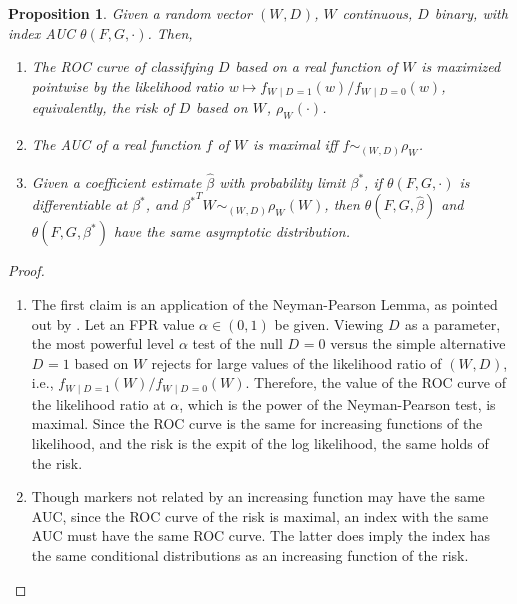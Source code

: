 \documentclass[12pt]{article}
\newcommand{\W}[1][]{W_{#1}}
\newcommand{\D}[1][]{D_{#1}}
\renewcommand{\t}[1]{{#1}^T}
\renewcommand{\star}[1]{{#1}^\ast}
\newcommand{\F}{F}
\newcommand{\G}{G}
\newcommand{\risk}[1][]{\rho_{#1}}
\newcommand{\auc}{\theta}
\newtheorem{proposition}[theorem]{Proposition}
\theoremstyle{definition}
\newcommand{\comment}[1]{
  \iftoggle{commenttoggle}{
    {\normalsize{\color{red}{ #1}}\normalsize}
  }
  {}
}
\begin{document}
\begin{proposition}
  Given a random vector $(\W,\D)$, $\W$ continuous, $\D$ binary, with
  index AUC $\auc(\F,\G,\cdot)$. Then,
\begin{enumerate}
\item The ROC curve of classifying $\D$ based on a real function of $\W$
is maximized pointwise by the likelihood ratio
$w\mapsto f_{\W\mid\D=1}(w)/f_{\W\mid\D=0}(w)$,\comment{cond desnities not defined}  equivalently, the risk of $\D$ based on $\W$, $\risk[{\W}](\cdot)$.

\item The AUC of a real function $f$ of $\W$ is maximal iff $f\sim_{(\W,\D)} \rho_{\W}$.

\item Given a coefficient estimate $\hat\beta$ with probability limit $\star\beta$, if $\auc(\F,\G,\cdot)$
  is differentiable at $\star\beta$, and
  $\t{\star\beta}\W\sim_{(\W,\D)} \risk[\W](\W)$,\comment{slight abuse of $\sim$ notation here} then $\auc(\F,\G,\hat\beta)$ and
  $\auc(\F,\G,\star\beta)$ have the same asymptotic distribution.
\end{enumerate}
\end{proposition}
\begin{proof}
  \begin{enumerate}
  \item The first claim is an application of the Neyman-Pearson Lemma,
    as pointed out by \citet{pepe2013}\comment{ check if she did it
      first. swets.}. Let an FPR value $\alpha\in (0,1)$ be
    given. Viewing $\D$ as a parameter, the most powerful level
    $\alpha$ test of the null $\D=0$ versus the simple alternative
    $\D=1$ based on $\W$ rejects for large values of the likelihood
    ratio of $(\W,\D)$, i.e.,
    $f_{\W\mid\D=1}(W)/f_{\W\mid\D=0}(W)$. Therefore, the value of the
    ROC curve of the likelihood ratio at $\alpha$, which is the power
    of the Neyman-Pearson test, is maximal. Since the ROC curve is the
    same for increasing functions of the likelihood, and the risk is
    the expit of the log likelihood, the same holds of the risk.
  
  \item Though markers not related by an increasing function may have the
  same AUC, since the ROC curve of the risk is maximal, an index with
  the same AUC must have the same ROC curve. The latter does imply the
  index has the same conditional distributions as an increasing
  function of the risk.
\end{enumerate}
\end{proof}
\end{document}
